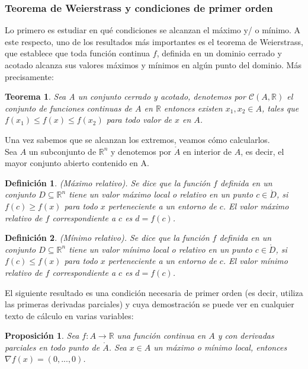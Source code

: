 \documentclass[a4paper,10pt]{article}
\newtheorem{theorem}{Teorema}
\newtheorem{proposition}{Proposición}
\newtheorem{definition}{Definición}
\begin{document}
\subsubsection{Teorema
de Weierstrass y condiciones de primer orden}
Lo primero es estudiar en qué condiciones se alcanzan el máximo y/ o mínimo.
A este respecto, uno de los resultados más importantes es el teorema de Weierstrass, que establece que toda función continua $f$, definida en un dominio cerrado
y acotado alcanza sus valores máximos y mínimos en algún punto del dominio.
Más precisamente:
\begin{theorem}
Sea A un conjunto cerrado y acotado, denotemos por $\mathcal{C}(A,\mathbb{R})$  el conjunto de funciones continuas de $A$ en $\mathbb{R}$ entonces existen $ x_{1},x_{2} \in A$, tales que $ f(x_{1}) \leq f(x) \leq f(x_{2})$ para todo valor de $x$ en $A$.
\end{theorem}
\noindent
Una vez sabemos que se alcanzan los extremos, veamos cómo calcularlos.
\\Sea $A$ un subconjunto de $\mathbb{R}^n$ y denotemos por $\mathring{A}$ en interior de $A$, es decir, el mayor conjunto abierto contenido en A.
\begin{definition}
(Máximo relativo). Se dice que la función $f$ definida en un conjunto $D\subseteq \mathbb{R}^n$ tiene un valor máximo local o relativo en un punto $c\in\mathring{D}$, si $f(c)\geq f(x)$ para todo $x$ perteneciente a un entorno de $c$. El valor máximo relativo de $f$ correspondiente a $c$ es $d = f(c)$.
\end{definition}
\begin{definition}
(Mínimo relativo). Se dice que la función $f$ definida en un conjunto $D\subseteq \mathbb{R}^n$ tiene un valor mínimo local o relativo en un punto $c\in\mathring{D}$, si $f(c)\leq f(x)$ para todo $x$ perteneciente a un entorno de $c$. El valor mínimo relativo de $f$ correspondiente a $c$ es $d = f(c)$.
\end{definition}
El siguiente resultado es una condición necesaria de primer orden (es decir,
utiliza las primeras derivadas parciales) y cuya demostración se puede ver en
cualquier texto de cálculo en varias variables:

\begin{proposition}
Sea $ f : A \rightarrow \mathbb{R}$ una función continua en $A$ y con derivadas
parciales en todo punto de $\mathring{A}$. Sea $x\in A$ un máximo o mínimo local,
entonces $\nabla f(x)=(0,...,0)$.

\end{proposition}
\end{document}
